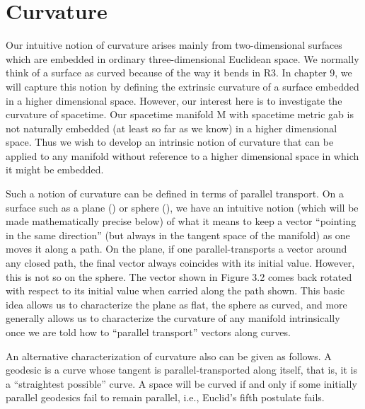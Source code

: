 \chapter{Curvature}
Our intuitive notion of curvature arises mainly from two-dimensional surfaces which are embedded in ordinary three-dimensional Euclidean space. We normally think of a surface as curved because of the way it bends in R3. In chapter 9, we will capture this notion by defining the extrinsic curvature of a surface embedded in a higher dimensional space. However, our interest here is to investigate the curvature of spacetime. Our spacetime manifold M with spacetime metric gab is not naturally embedded (at least so far as we know) in a higher dimensional space. Thus we wish to develop an intrinsic notion of curvature that can be applied to any manifold without reference to a higher dimensional space in which it might be embedded.

Such a notion of curvature can be defined in terms of parallel transport. On a surface such as a plane () or sphere (), we have an intuitive notion (which will be made mathematically precise below) of what it means to keep a vector ``pointing in the same direction'' (but always in the tangent space of the manifold) as one moves it along a path. On the plane, if one parallel-transports a vector around any closed path, the final vector always coincides with its initial value. However, this is not so on the sphere. The vector shown in Figure 3.2 comes back rotated with respect to its initial value when carried along the path shown. This basic idea allows us to characterize the plane as flat, the sphere as curved, and more generally allows us to characterize the curvature of any manifold intrinsically once we are told how to ``parallel transport'' vectors along curves. 

An alternative characterization of curvature also can be given as follows. A geodesic is a curve whose tangent is parallel-transported along itself, that is, it is a ``straightest possible'' curve. A space will be curved if and only if some initially parallel geodesics fail to remain parallel, i.e., Euclid's fifth postulate fails.

